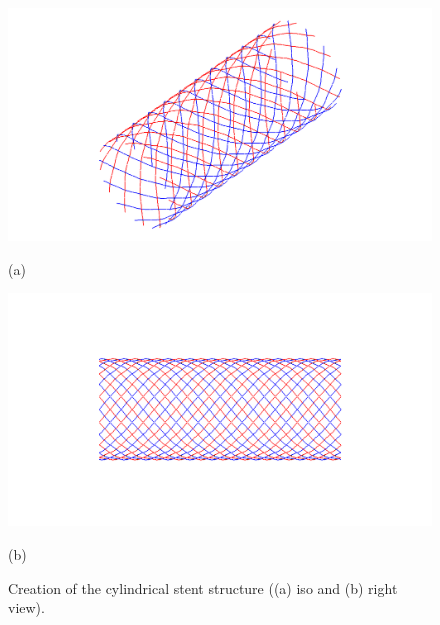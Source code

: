 \begin{figure} [ht]
   \centering
   \begin{makeimage}
   \end{makeimage}
   \begin{latexonly}
	\hspace{0.1cm}
	\begin{minipage} [c] [] [c]{5.5cm} 
	\includegraphics [width =\textwidth] {images/WireStentDemot2Step16}
	\begin{center}
	\vspace{-3ex}
	(a)
	\vspace{1ex}
	\end{center}
\end{minipage}
\hspace{0.3cm}
\begin{minipage} [c] [] [c] {5.5cm}
	\includegraphics [width =\textwidth] {images/WireStentDemot2Step15}
	\begin{center}
	\vspace{-3ex}
	(b)
	\vspace{1ex}
	\end{center}
\end{minipage}
\hspace{0.3cm}
   \end{latexonly}
   \begin{htmlonly}
   \end{htmlonly}
	\caption {Creation of the cylindrical stent structure ((a) iso and (b) right view).} 
	\label{stent}	
\end{figure}

